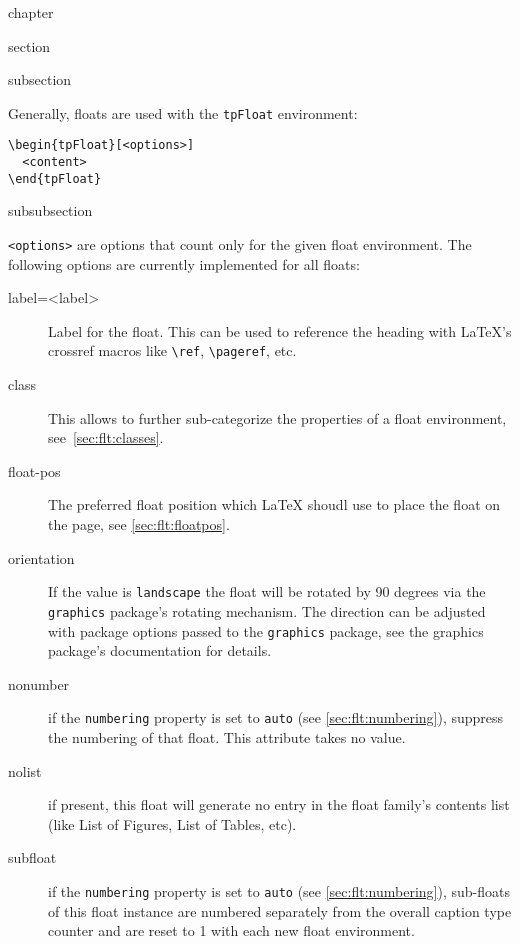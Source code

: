 \begin{heading}[label=chap:floats]{chapter}
\end{heading}

\begin{heading}{section}
\end{heading}

\begin{heading}{subsection}
\end{heading}

Generally, floats are used with the
\lstinline{tpFloat} environment:
\begin{lstlisting}[style=tex]
\begin{tpFloat}[<options>]
  <content>
\end{tpFloat}
\end{lstlisting}


\begin{heading}[label=sec:flt:opts]{subsubsection}
\end{heading}

\lstinline{<options>} are options that count only for the given float
environment. The following options are currently implemented for all
floats:
\begin{description}
\item[label=<label>] Label for the float. This can be used to
  reference the heading with \LaTeX's crossref macros like
  \lstinline{\ref}, \lstinline{\pageref}, etc.
\item[class] This allows to further sub-categorize the properties of a
  float environment, see~\ref{sec:flt:classes}.
\item[float-pos] The preferred float position which LaTeX shoudl use
  to place the float on the page, see \autoref{sec:flt:floatpos}.
\item[orientation] If the value is \lstinline{landscape} the float
  will be rotated by 90 degrees via the \lstinline{graphics} package's
  rotating mechanism. The direction can be adjusted with package
  options passed to the \lstinline{graphics} package, see the graphics
  package's documentation for details.
\item[nonumber] if the \lstinline{numbering} property is set to
  \lstinline{auto} (see \autoref{sec:flt:numbering}), suppress the
  numbering of that float. This attribute takes no value.
\item[nolist] if present, this float will generate no entry in the
  float family's contents list (like List of Figures, List of Tables,
  etc).
\item[subfloat] if the \lstinline{numbering} property is set to
  \lstinline{auto} (see \autoref{sec:flt:numbering}), sub-floats of
  this float instance are numbered separately from the overall caption
  type counter and are reset to 1 with each new float environment.
\end{description}


